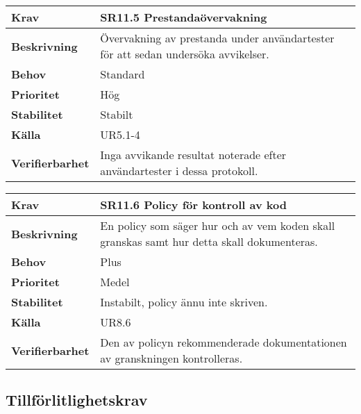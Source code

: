\documentclass[a4paper, twoside, 11pt, titlepage]{article}
\begin{document}
	\begin {table} [ht] \begin{tabular} { p{2.6cm} p{12.5cm} }
		\hline
		\sffamily\textbf{Krav} & \sffamily\textbf{SR11.5 Prestandaövervakning } \\
		\hline
		\sffamily\textbf{Beskrivning} &  Övervakning av prestanda under användartester för att sedan undersöka avvikelser.   \\
		\hline
		\sffamily\textbf{Behov} & Standard  \\
		\hline
		\sffamily\textbf{Prioritet} & Hög  \\
		\hline
		\sffamily\textbf{Stabilitet} & Stabilt  \\
		\hline
		\sffamily\textbf{Källa} &  UR5.1-4   \\
		\hline
		\sffamily\textbf{Verifierbarhet} &  Inga avvikande resultat noterade efter användartester i dessa protokoll.   \\
		\hline
	\end{tabular} \end{table} \FloatBarrier
	\vspace{6mm}

	\begin {table} [ht] \begin{tabular} { p{2.6cm} p{12.5cm} }
		\hline
		\sffamily\textbf{Krav} & \sffamily\textbf{SR11.6 Policy för kontroll av kod  } \\
		\hline
		\sffamily\textbf{Beskrivning} &  En policy som säger hur och av vem koden skall granskas samt hur detta skall dokumenteras.   \\
		\hline
		\sffamily\textbf{Behov} & Plus  \\
		\hline
		\sffamily\textbf{Prioritet} & Medel  \\
		\hline
		\sffamily\textbf{Stabilitet} & Instabilt, policy ännu inte skriven.  \\
		\hline
		\sffamily\textbf{Källa} &  UR8.6   \\
		\hline
		\sffamily\textbf{Verifierbarhet} &  Den av policyn rekommenderade dokumentationen av granskningen kontrolleras.   \\
		\hline
	\end{tabular} \end{table} \FloatBarrier


	\subsection{Tillförlitlighetskrav}
\end{document}
